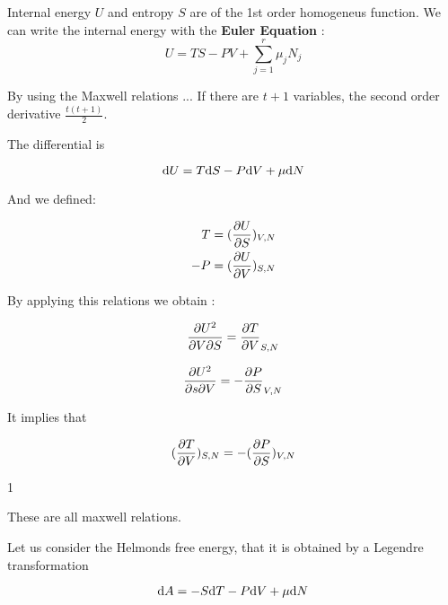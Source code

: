 \documentclass[../main/main.tex]{subfiles}
\begin{document}

Internal energy $U$ and entropy $S$ are of the 1st order homogeneus function.
We can write the internal energy with the \textbf{Euler Equation} :
\begin{equation}
  U = T S - P V + \sum_{j=1}^{r} \mu_j N_j
  \label{eq:}
\end{equation}

By using the Maxwell relations ...
If there are $t+1$ variables, the second order derivative $\frac{t(t+1)}{2}$.

The differential is

\begin{equation}
  \mathrm{d}{U} = T \mathrm{d}{S} - P \mathrm{d}{V} + \mu \mathrm{d}{N}
  \label{eq:}
\end{equation}

And we defined:

\begin{subequations}
\begin{align}
  T & = (\displaystyle \frac{\partial U}{\partial S} )_{V,N} \\
  -P & = (\displaystyle \frac{\partial U}{\partial V} )_{S,N}
\end{align}
\label{}
\end{subequations}


By applying this relations we obtain :

\begin{equation}
  \frac{\partial{U}^2 }{\partial V \partial S} = \displaystyle \frac{\partial T}{\partial V}_{S,N}
  \label{eq:}
\end{equation}

\begin{equation}
  \frac{\partial{U}^2 }{\partial s \partial V} = -\displaystyle \frac{\partial P}{\partial S}_{V,N}
  \label{eq:}
\end{equation}

It implies that

\begin{equation}
  (\displaystyle \frac{\partial T}{\partial V} )_{S,N} = - (\displaystyle \frac{\partial P}{\partial S} )_{V,N}
\end{equation}

1

These are all maxwell relations.

Let us consider the Helmonds free energy, that it is obtained by a Legendre transformation

\begin{equation}
  \mathrm{d}{A} = -S \mathrm{d}{T} - P \mathrm{d}{V} + \mu \mathrm{d}{N}
  \label{eq:}
\end{equation}
\end{document}

